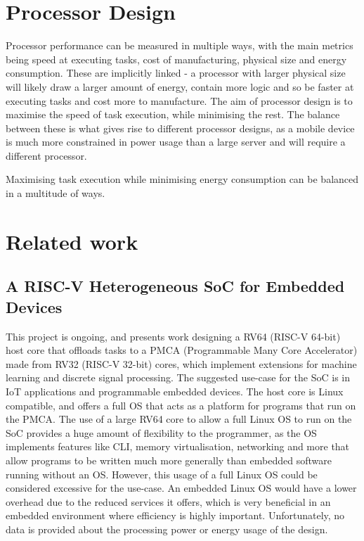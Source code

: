 \section{Processor Design}
Processor performance can be measured in multiple ways, with the main metrics being speed at executing tasks, cost of manufacturing, physical size and energy consumption. These are implicitly linked - a processor with larger physical size will likely draw a larger amount of energy, contain more logic and so be faster at executing tasks and cost more to manufacture. The aim of processor design is to maximise the speed of task execution, while minimising the rest. The balance between these is what gives rise to different processor designs, as a mobile device is much more constrained in power usage than a large server and will require a different processor.

Maximising task execution while minimising energy consumption can be balanced in a multitude of ways. 

\section{Related work}
\subsection{A RISC-V Heterogeneous SoC for Embedded Devices\cite{valenterisc}}
This project is ongoing, and presents work designing a RV64 (RISC-V 64-bit) host core that offloads tasks to a PMCA (Programmable Many Core Accelerator) made from RV32 (RISC-V 32-bit) cores, which implement extensions for machine learning and discrete signal processing. The suggested use-case for the SoC is in IoT applications and programmable embedded devices. The host core is Linux compatible, and offers a full OS that acts as a platform for programs that run on the PMCA. The use of a large RV64 core to allow a full Linux OS to run on the SoC provides a huge amount of flexibility to the programmer, as the OS implements features like CLI, memory virtualisation, networking and more that allow programs to be written much more generally than embedded software running without an OS. However, this usage of a full Linux OS could be considered excessive for the use-case. An embedded Linux OS would have a lower overhead due to the reduced services it offers, which is very beneficial in an embedded environment where efficiency is highly important. Unfortunately, no data is provided about the processing power or energy usage of the design.

